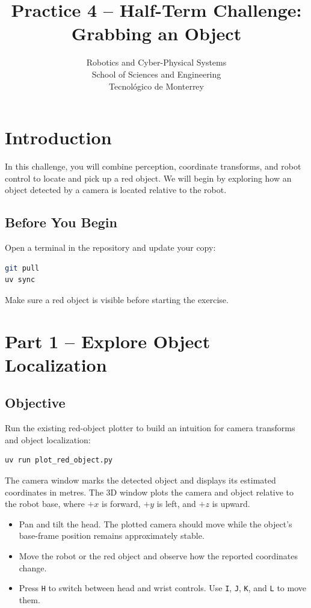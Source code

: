 \documentclass[11pt,a4paper]{article}
\title{\textbf{Practice 4 -- Half-Term Challenge: Grabbing an Object}}
\author{
    Robotics and Cyber-Physical Systems \\
    School of Sciences and Engineering \\
    Tecnol\'ogico de Monterrey
}
\date{}
\begin{document}
\maketitle

\section*{Introduction}

In this challenge, you will combine perception, coordinate transforms, and
robot control to locate and pick up a red object. We will begin by exploring
how an object detected by a camera is located relative to the robot.

\subsection*{Before You Begin}

Open a terminal in the repository and update your copy:

\begin{lstlisting}[language=bash]
git pull
uv sync
\end{lstlisting}

Make sure a red object is visible before starting the exercise.

\section*{Part 1 -- Explore Object Localization}

\subsection*{Objective}

Run the existing red-object plotter to build an intuition for camera
transforms and object localization:

\begin{lstlisting}[language=bash]
uv run plot_red_object.py
\end{lstlisting}

The camera window marks the detected object and displays its estimated
coordinates in metres. The 3D window plots the camera and object relative to
the robot base, where $+x$ is forward, $+y$ is left, and $+z$ is upward.

\begin{itemize}
    \item Pan and tilt the head. The plotted camera should move while the
          object's base-frame position remains approximately stable.
    \item Move the robot or the red object and observe how the reported
          coordinates change.
    \item Press \texttt{H} to switch between head and wrist controls. Use
          \texttt{I}, \texttt{J}, \texttt{K}, and \texttt{L} to move them.
\end{itemize}
\end{document}
